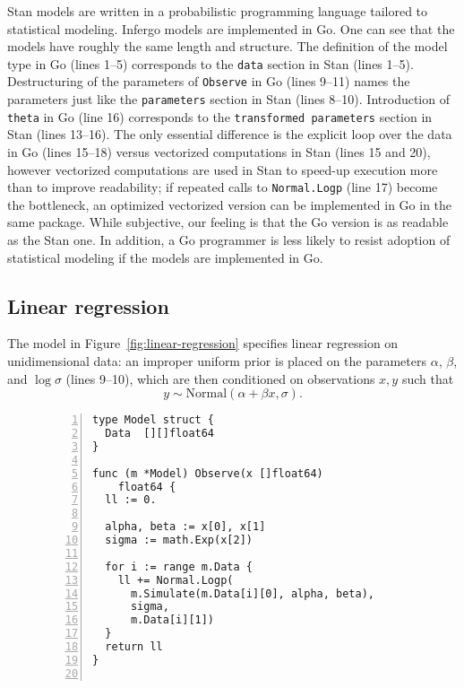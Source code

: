 \documentclass[sigplan,review,10pt,anonymous]{acmart}
\begin{document}
\begin{sloppypar}
Stan models are written in a probabilistic programming language
tailored to statistical modeling. Infergo models are implemented
in Go. One can see that the models have roughly the same length
and structure. The definition of the model type in Go (lines
1--5) corresponds to the \lstinline{data} section in Stan (lines
1--5). Destructuring of the parameters of \lstinline{Observe} in
Go (lines 9--11) names the parameters just like the
\lstinline{parameters} section in Stan (lines 8--10).
Introduction of \lstinline{theta} in Go (line 16) corresponds to
the \lstinline{transformed parameters} section in Stan (lines
13--16). The only essential difference is the explicit loop over
the data in Go (lines 15--18) versus vectorized computations in
Stan (lines 15 and 20), however vectorized computations are used
in Stan to speed-up execution more than to improve readability;
if repeated calls to \lstinline{Normal.Logp} (line 17) become
the bottleneck, an optimized vectorized version can be
implemented in Go in the same package. While subjective, our
feeling is that the Go version is as readable as the Stan one.
In addition, a Go programmer is less likely to resist adoption
of statistical modeling if the models are implemented in Go.

\subsection{Linear regression}
\label{sec:linear-regression}

The model in Figure~\ref{fig:linear-regression} specifies linear
regression on unidimensional data: an improper uniform prior is
placed on the parameters $\alpha$, $\beta$, and $\log \sigma$
(lines 9--10), which are then conditioned on observations $x, y$
such that
\begin{equation}
y \sim \mathrm{Normal}(\alpha + \beta x, \sigma).
	\label{eqn:linear-regression-1}
\end{equation}
\begin{figure}
\begin{lstlisting}[framexleftmargin=10pt,numbers=left]
type Model struct {
  Data  [][]float64
}

func (m *Model) Observe(x []float64)
    float64 {
  ll := 0.

  alpha, beta := x[0], x[1]
  sigma := math.Exp(x[2])

  for i := range m.Data {
    ll += Normal.Logp(
      m.Simulate(m.Data[i][0], alpha, beta),
	  sigma,
	  m.Data[i][1])
  }
  return ll
}


\end{lstlisting}
\end{figure}
\end{sloppypar}
\end{document}
